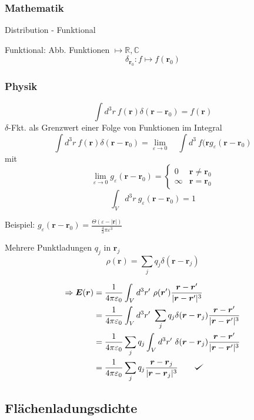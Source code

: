 \documentclass[titlepage,11pt,a4paper,ngerman]{report}
\def\checkmark{\tikz\fill[scale=0.4](0,.35) -- (.25,0) -- (1,.7) -- (.25,.15) -- cycle;}
\newcommand{\kq}{\frac{1}{4\pi\epsilon_0}}
\renewcommand{\vec}[1]{\boldsymbol{#1}}
\renewcommand{\epsilon}{\varepsilon}
\renewcommand{\paragraph}[1]{\subsubsection{#1}}
\begin{document}
\paragraph{Mathematik}
Distribution - Funktional

Funktional: Abb. Funktionen $\mapsto \mathbb R, \mathbb C$
$$\delta_{\vec{r}_0}: f \mapsto f(\vec{r}_0)$$

\paragraph{Physik}

$$\int d^3 r\ f(\vec{r}) \delta (\vec{r}-\vec{r}_0) = f(\vec{r})$$
$\delta$-Fkt. als Grenzwert einer Folge von Funktionen im Integral
$$\int d^3 r\ f(\vec{r}) \delta (\vec{r} - \vec{r}_0) = \lim_{\epsilon \to 0} \quad \int d^3\ f(\vec{r} g_\epsilon(\vec{r}-\vec{r}_0) $$
mit
$$\lim_{\epsilon \to 0} g_\epsilon (\vec{r}-\vec{r}_0) =  \left\{ \begin{array}{cc}
0 & \vec{r} \neq \vec{r}_0 \\
\infty & \vec{r} = \vec{r}_0
\end{array}\right.$$
$$\int_V d^3 r\ g_\epsilon (\vec{r}-\vec{r}_0) = 1$$

Beispiel: $g_\epsilon (\vec{r}-\vec{r}_0) = \frac{\Theta(\epsilon - |\vec{r}|)}{\frac{4}{3}\pi \epsilon^3}$

Mehrere Punktladungen $q_j$ in $\vec{r}_j$
$$\rho(\vec{r}) = \sum_j q_j \delta(\vec{r}-\vec{r}_j)$$

\begin{align*}
 	\Rightarrow \vec{E}(\vec{r}) &= \kq \int_V d^3 r'\ \rho(\vec{r}') \frac{\vec{r} - \vec{r}'}{|\vec{r} - \vec{r}'|^3}\\
	&= \kq \int_V d^3 r'\ \sum_j q_j \delta(\vec{r} - \vec{r}_j) \frac{\vec{r} - \vec{r}'}{|\vec{r} - \vec{r}'|^3}\\
	&= \kq \sum_j q_j \int_V d^3 r'\ \delta(\vec{r} - \vec{r}_j) \frac{\vec{r} - \vec{r}'}{|\vec{r} - \vec{r}'|^3}\\
	&= \kq \sum_j q_j \frac{\vec{r} - \vec{r}_j}{|\vec{r} - \vec{r}_j|^3} \qquad \checkmark\\
\end{align*}

\subsection{Flächenladungsdichte}
\end{document}
